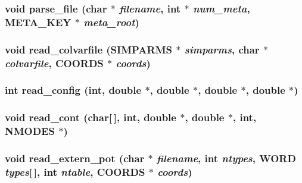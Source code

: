 \subsubsection{\setlength{\rightskip}{0pt plus 5cm}void parse\_\-file (char $\ast$ {\em filename}, int $\ast$ {\em num\_\-meta}, {\bf META\_\-KEY} $\ast$ {\em meta\_\-root})}\label{input_2proto__input_8h_670bf9c981a172051c3a05032e890b00}


\subsubsection{\setlength{\rightskip}{0pt plus 5cm}void read\_\-colvarfile ({\bf SIMPARMS} $\ast$ {\em simparms}, char $\ast$ {\em colvarfile}, {\bf COORDS} $\ast$ {\em coords})}\label{input_2proto__input_8h_43706745fd12499bf9a633b44869b447}


\subsubsection{\setlength{\rightskip}{0pt plus 5cm}int read\_\-config (int, double $\ast$, double $\ast$, double $\ast$, double $\ast$)}\label{input_2proto__input_8h_459c0f7de74690aa3b56315086690241}


\subsubsection{\setlength{\rightskip}{0pt plus 5cm}void read\_\-cont (char[$\,$], int, double $\ast$, double $\ast$, int, {\bf NMODES} $\ast$)}\label{input_2proto__input_8h_b83eefe12859e2a799621a1bb9a31dc9}


\subsubsection{\setlength{\rightskip}{0pt plus 5cm}void read\_\-extern\_\-pot (char $\ast$ {\em filename}, int {\em ntypes}, {\bf WORD} {\em types}[$\,$], int {\em ntable}, {\bf COORDS} $\ast$ {\em coords})}\label{input_2proto__input_8h_673edb482606daeb69fa8a4aad4c31ba}


